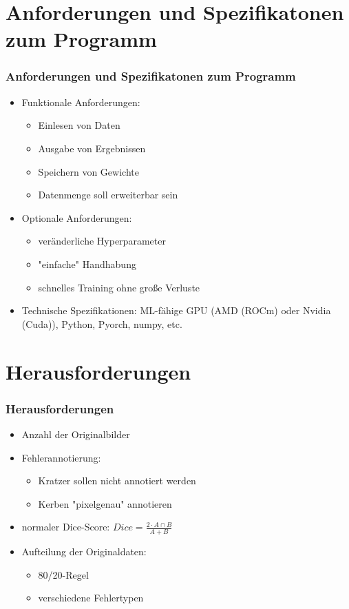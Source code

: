 \documentclass{beamer}
\begin{document}
\section{Anforderungen und Spezifikatonen zum Programm}
\begin{frame}
    \frametitle{Anforderungen und Spezifikatonen zum Programm}
    \begin{itemize}
        \item Funktionale Anforderungen:
            \begin{itemize}
                \item Einlesen von Daten
                \item Ausgabe von Ergebnissen
                \item Speichern von Gewichte
                \item Datenmenge soll erweiterbar sein
            \end{itemize}
        \item Optionale Anforderungen:
            \begin{itemize}
                \item veränderliche Hyperparameter
                \item "einfache" Handhabung
                \item schnelles Training ohne große Verluste
            \end{itemize}
        \item Technische Spezifikationen: 
        ML-fähige GPU (AMD (ROCm) oder Nvidia (Cuda)), 
        Python, Pyorch, numpy, etc.
    \end{itemize}
\end{frame}

\section{Herausforderungen}
\begin{frame}
\frametitle{Herausforderungen}
\begin{itemize}
    \item Anzahl der Originalbilder
    \item Fehlerannotierung:
    \begin{itemize}
        \item Kratzer sollen nicht annotiert werden
        \item Kerben "pixelgenau" annotieren
    \end{itemize}
    \item normaler Dice-Score:\newline
    $Dice = \frac{2 \cdot A \cap B}{A + B}$ 
    \item Aufteilung der Originaldaten:
    \begin{itemize}
        \item 80/20-Regel
        \item verschiedene Fehlertypen
    \end{itemize}
\end{itemize}
\end{frame}
\end{document}
